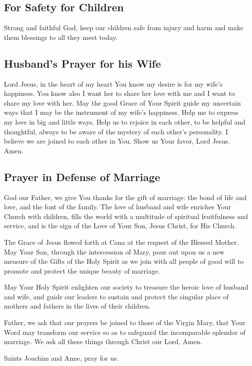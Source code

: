 \documentclass[12pt]{article}
\newcommand{\prayertitle}[1]{\subsection{#1}}
\begin{document}
\prayertitle{For Safety for Children}
\label{prayer:safety_children}
Strong and faithful God, keep our children safe from injury and harm and make them blessings to all they meet today.

\prayertitle{Husband's Prayer for his Wife}
Lord Jesus, in the heart of my heart You know my desire is for my wife's happiness.
You know also I want her to share her love with me and I want to share my love with her.
May the good Grace of Your Spirit guide my uncertain ways that I may be the instrument of my wife's happiness.
Help me to express my love in big and little ways.
Help us to rejoice in each other, to be helpful and thoughtful, always to be aware of the mystery of each other's personality.
I believe we are joined to each other in You.
Show us Your favor, Lord Jesus.
Amen.

\prayertitle{Prayer in Defense of Marriage}
\label{prayer:defense_marriage}
God our Father, we give You thanks for the gift of marriage:
the bond of life and love, and the font of the family. 
The love of husband and wife enriches Your Church with children, fills the world with a multitude of spiritual fruitfulness and service,
and is the sign of the Love of Your Son, Jesus Christ, for His Church.

The Grace of Jesus flowed forth at Cana at the request of the Blessed Mother.
May Your Son, through the intercession of Mary, pour out upon us a new measure of the Gifts of the Holy Spirit as we join with all people of good will to promote and protect the unique beauty of marriage.

May Your Holy Spirit enlighten our society to treasure the heroic love of husband and wife, and guide our leaders to sustain and protect
the singular place of mothers and fathers in the lives of their children.

Father, we ask that our prayers be joined to those of the Virgin Mary, that Your Word may transform our service so as to safeguard the incomparable splendor of marriage.
We ask all these things through Christ our Lord,
Amen.

Saints Joachim and Anne, pray for us.

\newpage
\end{document}
